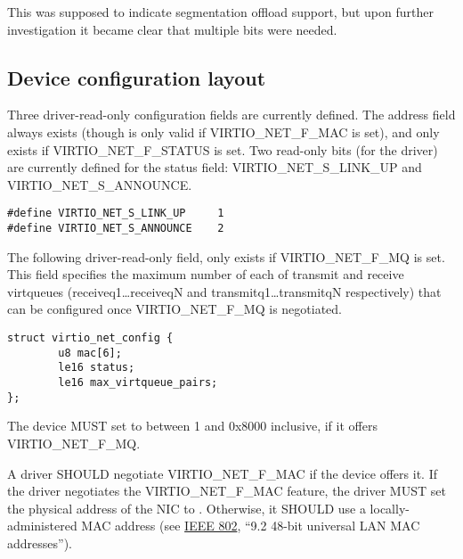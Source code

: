 This was supposed to indicate segmentation offload support, but
upon further investigation it became clear that multiple bits
were needed.

\subsection{Device configuration layout}\label{sec:Device Types / Network Device / Device configuration layout}

Three driver-read-only configuration fields are currently defined. The  address field
always exists (though is only valid if VIRTIO_NET_F_MAC is set), and
 only exists if VIRTIO_NET_F_STATUS is set. Two
read-only bits (for the driver) are currently defined for the status field:
VIRTIO_NET_S_LINK_UP and VIRTIO_NET_S_ANNOUNCE.

\begin{lstlisting}
#define VIRTIO_NET_S_LINK_UP     1
#define VIRTIO_NET_S_ANNOUNCE    2
\end{lstlisting}

The following driver-read-only field,  only exists if
VIRTIO_NET_F_MQ is set. This field specifies the maximum number
of each of transmit and receive virtqueues (receiveq1\ldots receiveqN
and transmitq1\ldots transmitqN respectively) that can be configured once VIRTIO_NET_F_MQ
is negotiated.

\begin{lstlisting}
struct virtio_net_config {
        u8 mac[6];
        le16 status;
        le16 max_virtqueue_pairs;
};
\end{lstlisting}


The device MUST set  to between 1 and 0x8000 inclusive,
if it offers VIRTIO_NET_F_MQ.


A driver SHOULD negotiate VIRTIO_NET_F_MAC if the device offers it.
If the driver negotiates the VIRTIO_NET_F_MAC feature, the driver MUST set
the physical address of the NIC to .  Otherwise, it SHOULD
use a locally-administered MAC address (see \hyperref[intro:IEEE 802]{IEEE 802},
``9.2 48-bit universal LAN MAC addresses'').

